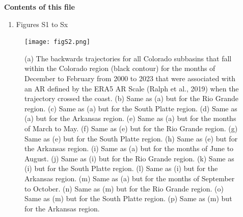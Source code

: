 \documentclass[draft,jgrga]{agutexSI2019}
\begin{document}

%
%



\noindent\textbf{Contents of this file}
\begin{enumerate}
\item Figures S1 to Sx
\end{enumerate}



\begin{figure}
\noindent\texttt{[image: figS2.png]}
\caption{(a) The backwards trajectories for all Colorado subbasins that fall within the Colorado region (black contour) for the months of December to February from 2000 to 2023 that were associated with an AR defined by the ERA5 AR Scale (Ralph et al., 2019) when the trajectory crossed the coast. (b) Same as (a) but for the Rio Grande region. (c) Same as (a) but for the South Platte region. (d) Same as (a) but for the Arkansas region. (e) Same as (a) but for the months of March to May. (f) Same as (e) but for the Rio Grande region. (g) Same as (e) but for the South Platte region. (h) Same as (e) but for the Arkansas region. (i) Same as (a) but for the months of June to August. (j) Same as (i) but for the Rio Grande region. (k) Same as (i) but for the South Platte region. (l) Same as (i) but for the Arkansas region. (m) Same as (a) but for the months of September to October. (n) Same as (m) but for the Rio Grande region. (o) Same as (m) but for the South Platte region. (p) Same as (m) but for the Arkansas region.}
\label{fig:supp:spaghetti_ssn}
\end{figure}
\end{document}
